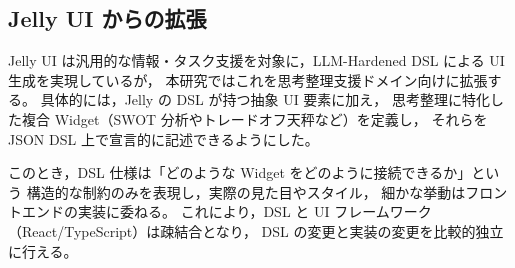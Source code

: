 \documentclass[senior,final,11pt,dvipdfmx]{iputit-thesis}
\begin{document}
\subsection{Jelly UI からの拡張}

Jelly UI は汎用的な情報・タスク支援を対象に，LLM-Hardened DSL による UI 生成を実現しているが，
本研究ではこれを思考整理支援ドメイン向けに拡張する。
具体的には，Jelly の DSL が持つ抽象 UI 要素に加え，
思考整理に特化した複合 Widget（SWOT 分析やトレードオフ天秤など）を定義し，
それらを JSON DSL 上で宣言的に記述できるようにした。

このとき，DSL 仕様は「どのような Widget をどのように接続できるか」という
構造的な制約のみを表現し，実際の見た目やスタイル，
細かな挙動はフロントエンドの実装に委ねる。
これにより，DSL と UI フレームワーク（React/TypeScript）は疎結合となり，
DSL の変更と実装の変更を比較的独立に行える。




\end{document}
